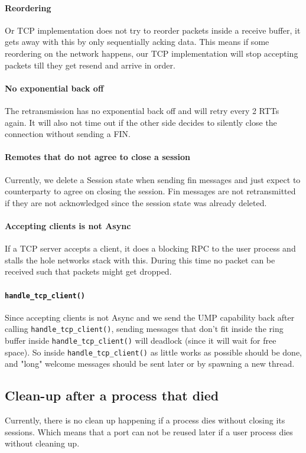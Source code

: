 \paragraph{Reordering}
Or TCP implementation does not try to reorder packets inside a receive buffer, it gets away with this by only sequentially acking data. This means if some reordering on the network happens, our TCP implementation will stop accepting packets till they get resend and arrive in order.

\paragraph{No exponential back off}
The retransmission has no exponential back off and will retry every 2 RTTs again. It will also not time out if the other side decides to silently close the connection without sending a FIN. 

\paragraph{Remotes that do not agree to close a session}
Currently, we delete a Session state when sending fin messages and just expect to counterparty to agree on closing the session. Fin messages are not retransmitted if they are not acknowledged since the session state was already deleted.

\paragraph{Accepting clients is not Async}
If a TCP server accepts a client, it does a blocking RPC to the user process and stalls the hole networks stack with this. During this time no packet can be received such that packets might get dropped.

\paragraph{\texttt{handle_tcp_client()}}
Since accepting clients is not Async and we send the UMP capability back after calling \texttt{handle_tcp_client()}, sending messages that don't fit inside the ring buffer inside \texttt{handle_tcp_client()} will deadlock (since it will wait for free space). So inside \texttt{handle_tcp_client()} as little works as possible should be done, and "long" welcome messages should be sent later or by spawning a new thread.

\subsection{Clean-up after a process that died}

Currently, there is no clean up happening if a process dies without closing its sessions. Which means that a port can not be reused later if a user process dies without cleaning up.













